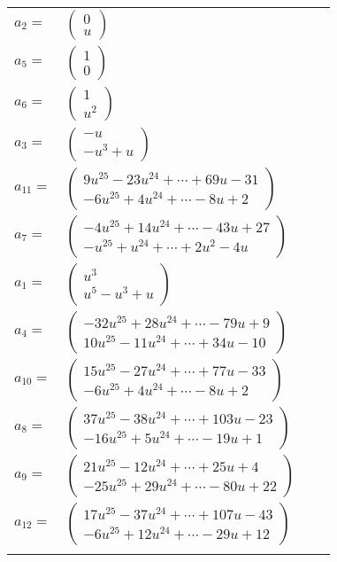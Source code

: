 \documentclass[1p]{elsarticle_modified}
\theoremstyle{definition}
\begin{document}
\begin{tabular}{m{7pt} m{180pt} m{7pt} m{180pt} }
\flushright $a_{2}=$&$\begin{pmatrix}0\\u\end{pmatrix}$ \\
\flushright $a_{5}=$&$\begin{pmatrix}1\\0\end{pmatrix}$ \\
\flushright $a_{6}=$&$\begin{pmatrix}1\\u^2\end{pmatrix}$ \\
\flushright $a_{3}=$&$\begin{pmatrix}- u\\- u^3+u\end{pmatrix}$ \\
\flushright $a_{11}=$&$\begin{pmatrix}9 u^{25}-23 u^{24}+\cdots+69 u-31\\-6 u^{25}+4 u^{24}+\cdots-8 u+2\end{pmatrix}$ \\
\flushright $a_{7}=$&$\begin{pmatrix}-4 u^{25}+14 u^{24}+\cdots-43 u+27\\- u^{25}+u^{24}+\cdots+2 u^2-4 u\end{pmatrix}$ \\
\flushright $a_{1}=$&$\begin{pmatrix}u^3\\u^5- u^3+u\end{pmatrix}$ \\
\flushright $a_{4}=$&$\begin{pmatrix}-32 u^{25}+28 u^{24}+\cdots-79 u+9\\10 u^{25}-11 u^{24}+\cdots+34 u-10\end{pmatrix}$ \\
\flushright $a_{10}=$&$\begin{pmatrix}15 u^{25}-27 u^{24}+\cdots+77 u-33\\-6 u^{25}+4 u^{24}+\cdots-8 u+2\end{pmatrix}$ \\
\flushright $a_{8}=$&$\begin{pmatrix}37 u^{25}-38 u^{24}+\cdots+103 u-23\\-16 u^{25}+5 u^{24}+\cdots-19 u+1\end{pmatrix}$ \\
\flushright $a_{9}=$&$\begin{pmatrix}21 u^{25}-12 u^{24}+\cdots+25 u+4\\-25 u^{25}+29 u^{24}+\cdots-80 u+22\end{pmatrix}$ \\
\flushright $a_{12}=$&$\begin{pmatrix}17 u^{25}-37 u^{24}+\cdots+107 u-43\\-6 u^{25}+12 u^{24}+\cdots-29 u+12\end{pmatrix}$\\&\end{tabular}
\end{document}
